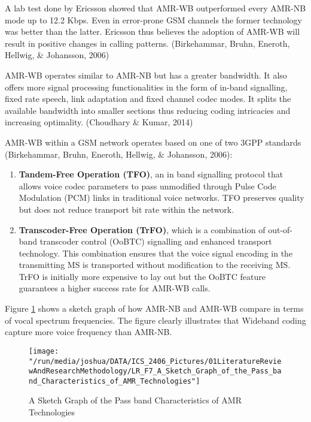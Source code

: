 \documentclass[12pt,svgnames,smaller]{article} %
\begin{document}
\begin{enumerate}
		A lab test done by Ericsson showed that AMR-WB outperformed every AMR-NB mode up to 12.2 Kbps. Even in error-prone GSM channels the former technology was better than the latter. Ericsson thus believes the adoption of AMR-WB will result in positive changes in calling patterns. (Birkehammar, Bruhn, Eneroth, Hellwig, \& Johansson, 2006)
		
		AMR-WB operates similar to AMR-NB but has a greater bandwidth.  It also offers more signal processing functionalities in the form of in-band signalling, fixed rate speech, link adaptation and fixed channel codec modes. It splits the available bandwidth into smaller sections thus reducing coding intricacies and increasing optimality. (Choudhary \& Kumar, 2014)
		
		AMR-WB within a GSM network operates based on one of two 3GPP standards (Birkehammar, Bruhn, Eneroth, Hellwig, \& Johansson, 2006):
		
		\begin{enumerate}
			\item \textbf{Tandem-Free Operation (TFO)}, an in band signalling protocol that allows voice codec parameters to pass unmodified through Pulse Code Modulation (PCM) links in traditional voice networks.  TFO preserves quality but does not reduce transport bit rate within the network.
			\item \textbf{Transcoder-Free Operation (TrFO)}, which is a combination of out-of-band transcoder control (OoBTC) signalling and enhanced transport technology. This combination ensures that the voice signal encoding in the transmitting MS is transported without modification to the receiving MS. TrFO is initially more expensive to lay out but the OoBTC feature guarantees a higher success rate for AMR-WB calls.
		\end{enumerate}
		
		Figure \ref{fig:LiteratureReview-Figure7} shows a sketch graph of how AMR-NB and AMR-WB compare in terms of vocal spectrum frequencies. The figure clearly illustrates that Wideband coding capture more voice frequency than AMR-NB.
		
		\begin{figure}
			\centering
			\texttt{[image: "/run/media/joshua/DATA/ICS\_2406\_Pictures/01LiteratureReviewAndResearchMethodology/LR\_F7\_A\_Sketch\_Graph\_of\_the\_Pass\_band\_Characteristics\_of\_AMR\_Technologies"]}
			\caption{A Sketch Graph of the Pass band Characteristics of AMR Technologies}
			\label{fig:LiteratureReview-Figure7}
		\end{figure}
		

\end{enumerate}
\end{document}

